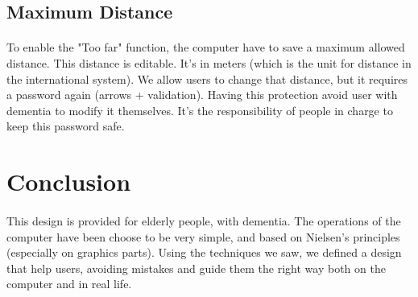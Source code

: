\documentclass[a4paper,11pt]{article} %
\begin{document}
\subsection{Maximum Distance}
\paragraph{}To enable the "Too far" function, the computer have to save a maximum allowed distance. This distance is editable. It's in meters (which is the unit for distance in the international system). We allow users to change that distance, but it requires a password again (arrows + validation). Having this protection avoid user with dementia to modify it themselves. It's the responsibility of people in charge to keep this password safe.
\section*{Conclusion}
\paragraph{}This design is provided for elderly people, with dementia. The operations of the computer have been choose to be very simple, and based on Nielsen's principles (especially on graphics parts). Using the techniques we saw, we defined a design that help users, avoiding mistakes and guide them the right way both on the computer and in real life. 

%
%
\end{document}
